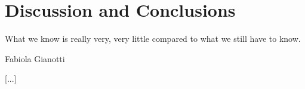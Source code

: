\chapter{Discussion and Conclusions}
\label{chapter:discussion}

\epigraph{What we know is really very, very little compared to what we still have to know.}{Fabiola Gianotti}

[...]